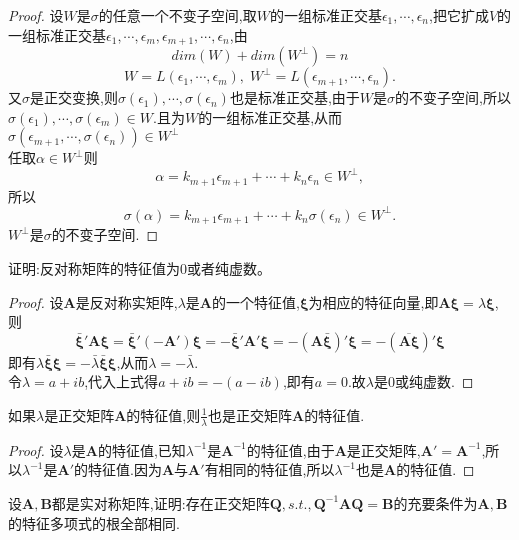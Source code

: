 \documentclass[lang=cn,11pt,normal]{elegantbook}
\begin{document}
	\begin{proof}
		设$W$是$\sigma$的任意一个不变子空间,取$W$的一组标准正交基$\epsilon_1,\cdots,\epsilon_n$,把它扩成$V$的一组标准正交基$\epsilon_1,\cdots,\epsilon_m,\epsilon_{m+1},\cdots,\epsilon_n$,由
		$$
		dim(W)+dim(W^\perp)=n
		$$
		$$
		W=L(\epsilon_1,\cdots,\epsilon_m),\;W^\perp=L(\epsilon_{m+1},\cdots,\epsilon_n).
		$$
		又$\sigma$是正交变换,则$\sigma(\epsilon_1),\cdots,\sigma(\epsilon_n)$也是标准正交基,由于$W$是$\sigma$的不变子空间,所以$\sigma(\epsilon_1),\cdots,\sigma(\epsilon_m)\in W$.且为$W$的一组标准正交基,从而$\sigma(\epsilon_{m+1},\cdots,\sigma(\epsilon_n))\in W^\perp$\\
		任取$\alpha\in W^\perp$则
		$$
		\alpha=k_{m+1}\epsilon_{m+1}+\cdots+k_n\epsilon_n\in W^\perp,
		$$
		所以
		$$
		\sigma(\alpha)=k_{m+1}\epsilon_{m+1}+\cdots+k_n\sigma(\epsilon_n)\in W^\perp.
		$$
		$W^\perp$是$\sigma$的不变子空间.
	\end{proof}
	\begin{exercise}
		证明:反对称矩阵的特征值为0或者纯虚数。
	\end{exercise}
	\begin{proof}
		设$\boldsymbol{A}$是反对称实矩阵,$\lambda$是$\boldsymbol{A}$的一个特征值,$\boldsymbol{\xi}$为相应的特征向量,即$\boldsymbol{A\xi}=\lambda\boldsymbol{\xi}$,则
		$$
		\bar{\boldsymbol{\xi}}'\boldsymbol{A\xi}=\bar{\boldsymbol{\xi}}'(-\boldsymbol{A}')\boldsymbol{\xi}=-\bar{\boldsymbol{\xi}}'\boldsymbol{A}'\boldsymbol{\xi}=-(\boldsymbol{A}\bar{\boldsymbol{\xi}})'\boldsymbol{\xi}=-(\overline{\boldsymbol{A\xi}})'\boldsymbol{\xi}
		$$
		即有$\lambda\bar{\boldsymbol{\xi}}\boldsymbol{\xi}=-\bar{\lambda}\bar{\boldsymbol{\xi}}\boldsymbol{\xi}$,从而$\lambda=-\bar{\lambda}$.\\
		令$\lambda=a+ib$,代入上式得$a+ib=-(a-ib)$,即有$a=0$.故$\lambda$是0或纯虚数.
	\end{proof}
	\begin{exercise}
		如果$\lambda$是正交矩阵$\boldsymbol{A}$的特征值,则$\frac{1}{\lambda}$也是正交矩阵$\boldsymbol{A}$的特征值.
	\end{exercise}
	\begin{proof}
		设$\lambda$是$\boldsymbol{A}$的特征值,已知$\lambda^{-1}$是$\boldsymbol{A}^{-1}$的特征值,由于$\boldsymbol{A}$是正交矩阵,$\boldsymbol{A}'=\boldsymbol{A}^{-1}$,所以$\lambda^{-1}$是$\boldsymbol{A}'$的特征值.因为$\boldsymbol{A}$与$\boldsymbol{A}'$有相同的特征值,所以$\lambda^{-1}$也是$\boldsymbol{A}$的特征值.
	\end{proof}
	\begin{exercise}
		设$\boldsymbol{A},\boldsymbol{B}$都是实对称矩阵,证明:存在正交矩阵$\boldsymbol{Q},s.t.,\boldsymbol{Q}^{-1}\boldsymbol{AQ}=\boldsymbol{B}$的充要条件为$\boldsymbol{A},\boldsymbol{B}$的特征多项式的根全部相同.
	\end{exercise}
\end{document}
